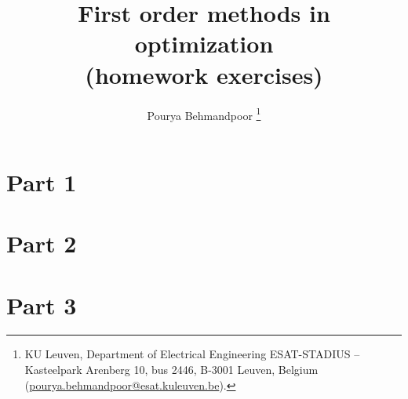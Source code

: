\documentclass[fleqn]{article}
\title{First order methods in optimization\\(homework exercises)}
\author{Pourya Behmandpoor
\thanks{KU Leuven, Department of Electrical Engineering ESAT-STADIUS -- Kasteelpark Arenberg 10, bus 2446, B-3001 Leuven, Belgium (\href{mailto:pourya.behmandpoor@esat.kuleuven.be}{pourya.behmandpoor@esat.kuleuven.be}).}}
\begin{document}
    \maketitle
    
    \section{Part 1}
        
    \section{Part 2}
        
    \section{Part 3}
        
\end{document}
